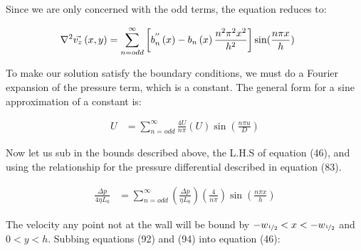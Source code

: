 \documentclass[titlepage]{article}
\begin{document}
    \noindent Since we are only concerned with the odd terms, the equation reduces to:

    \begin{align}
        \nabla^2\vec{v_{z}}\left(x,y\right) &= \sum_{n=odd}^{\infty}\left[b_{n}^{''}\left(x\right) - b_{n}\left(x\right)\displaystyle\frac{n^{2}\pi^{2}x^{2}}{h^2}\right]\sin(\displaystyle\frac{n\pi{x}}{h}) \hspace*{5pt}
    \end{align}

    \noindent To make our solution satisfy the boundary conditions, we must do a Fourier expansion of the pressure term, which is a constant. The general form for a sine approximation of a constant is: 

    \begin{align}
        U &= \sum_{n=odd}^{\infty}\displaystyle\frac{4U}{n\pi}\left(U\right)\sin(\displaystyle\frac{n\pi{u}}{D})
    \end{align}

    \noindent Now let us sub in the bounds described above, the L.H.S of equation (46), and using the relationship for the pressure differential described in equation (83).

    \begin{align}
        \displaystyle\frac{\Delta{p}}{4
        \eta{L_0}} &= \sum_{n=odd}^{\infty}\left(\displaystyle\frac{\Delta{p}}{\eta{L_0}}\right)\left(\displaystyle\frac{4}{n\pi}\right)\sin(\displaystyle\frac{n\pi{x}}{h})
    \end{align}


    \noindent The velocity any point not at the wall will be bound by $-w_{\nicefrac{1}{2}} < x < -w_{\nicefrac{1}{2}}$ and $0 < y < h$. Subbing equations (92) and (94) into equation (46):
\end{document}
